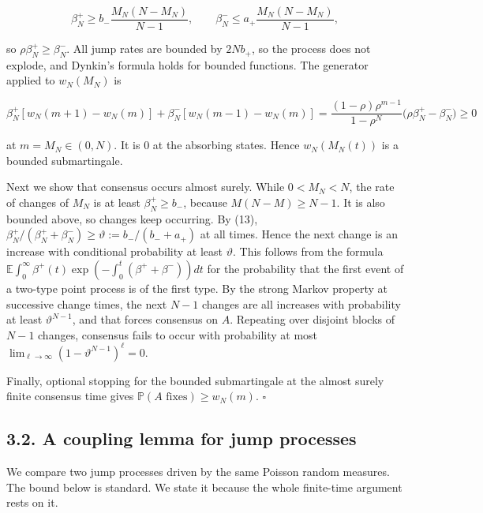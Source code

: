 \documentclass[
  british,
  11pt,
  a4paper,
]{article}
\begin{document}
\[
\beta_N^+\ge b_-\frac{M_N(N-M_N)}{N-1},\qquad
\beta_N^-\le a_+\frac{M_N(N-M_N)}{N-1},
\tag{13}
\]

so \(\rho\beta_N^+\ge\beta_N^-\). All jump rates are bounded by
\(2Nb_+\), so the process does not explode, and Dynkin's formula holds
for bounded functions. The generator applied to \(w_N(M_N)\) is

\[
\beta_N^+[w_N(m+1)-w_N(m)]+\beta_N^-[w_N(m-1)-w_N(m)]
=\frac{(1-\rho)\rho^{m-1}}{1-\rho^N}\bigl(\rho\beta_N^+-\beta_N^-\bigr)\ge0
\]

at \(m=M_N\in(0,N)\). It is \(0\) at the absorbing states. Hence
\(w_N(M_N(t))\) is a bounded submartingale.

Next we show that consensus occurs almost surely. While \(0<M_N<N\), the
rate of changes of \(M_N\) is at least \(\beta_N^+\ge b_-\), because
\(M(N-M)\ge N-1\). It is also bounded above, so changes keep occurring.
By (13), \(\beta_N^+/(\beta_N^++\beta_N^-)\ge\vartheta:=b_-/(b_-+a_+)\)
at all times. Hence the next change is an increase with conditional
probability at least \(\vartheta\). This follows from the formula
\(\mathbb E\int_0^\infty\beta^+(t)\exp(-\int_0^t(\beta^++\beta^-))dt\)
for the probability that the first event of a two-type point process is
of the first type. By the strong Markov property at successive change
times, the next \(N-1\) changes are all increases with probability at
least \(\vartheta^{N-1}\), and that forces consensus on \(A\). Repeating
over disjoint blocks of \(N-1\) changes, consensus fails to occur with
probability at most \(\lim_{\ell\to\infty}(1-\vartheta^{N-1})^\ell=0\).

Finally, optional stopping for the bounded submartingale at the almost
surely finite consensus time gives
\(\mathbb P(A\text{ fixes})\ge w_N(m)\). \(\square\)

\subsection{3.2. A coupling lemma for jump
processes}\label{a-coupling-lemma-for-jump-processes}

We compare two jump processes driven by the same Poisson random
measures. The bound below is standard. We state it because the whole
finite-time argument rests on it.
\end{document}
